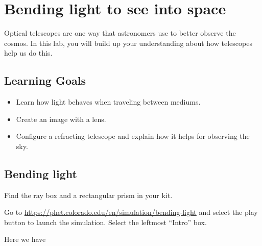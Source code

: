 \chapter{Bending light to see into space}

Optical telescopes are one way that astronomers use to better observe the cosmos. In this lab, you will build up your understanding about how telescopes help us do this.

\section{Learning Goals}

\begin{itemize}
	\item Learn how light behaves when traveling between mediums.
	
	\item Create an image with a lens.
	
	\item Configure a refracting telescope and explain how it helps for observing the sky.
\end{itemize}

\section{Bending light}



\begin{steps}
	\item Find the ray box and a rectangular prism in your kit.
	
	\item Go to \url{https://phet.colorado.edu/en/simulation/bending-light} and select the play button to launch the simulation. Select the leftmost ``Intro'' box.
\end{steps}

Here we have